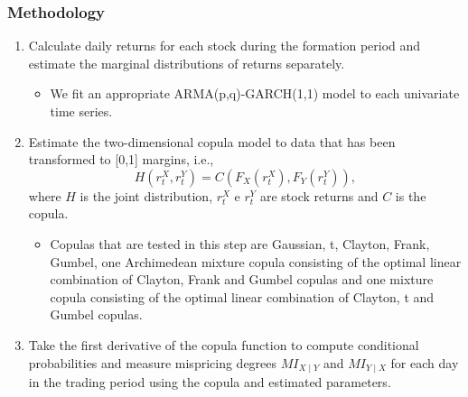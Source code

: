 \documentclass[pdf,9pt,xcolor=dvipsnames,hide notes]{beamer}
\begin{document}
	
\begin{frame}[label=frame4h]
	\frametitle{Methodology}
	
	\begin{enumerate}[(1)]
		\justifying
		
		\item  Calculate daily returns for each stock during the formation period and estimate the marginal distributions of returns separately.
		\vspace{0.3cm}
		
		\begin{itemize}	
			\item We fit an appropriate ARMA(p,q)-GARCH(1,1) model to each univariate time series.
		\end{itemize}
		
		\vspace{0.3cm}
		
		\item Estimate the two-dimensional copula model to data that has been transformed to [0,1] margins, i.e.,
		\[
		H\left( r_{t}^{X},r_{t}^{Y}\right) =C\left(F_{X}\left( r_{t}^{X}\right)
		,F_{Y}\left( r_{t}^{Y}\right) \right) , 
		\]%
		where $H$ is the joint distribution, $r_{t}^{X}$ e $r_{t}^{Y}$ are stock
		returns and $C$ is the copula.
		
		\vspace{0.3cm}
		
		\begin{itemize}	
			\item Copulas that are tested in this step are Gaussian, t, Clayton, Frank, Gumbel, one Archimedean mixture copula consisting of the optimal linear combination of Clayton, Frank and Gumbel copulas and one mixture copula consisting of the optimal linear combination of Clayton, t and Gumbel copulas.
			
		\end{itemize}
		
		\vspace{0.3cm}
		
		\item Take the first derivative of the copula function to compute conditional
		probabilities and measure mispricing degrees $MI_{X\mid Y}$ and $MI_{Y\mid X}$ for each day in the trading period using the copula and estimated parameters.
		
	\end{enumerate}
	
\end{frame}
\end{document}
